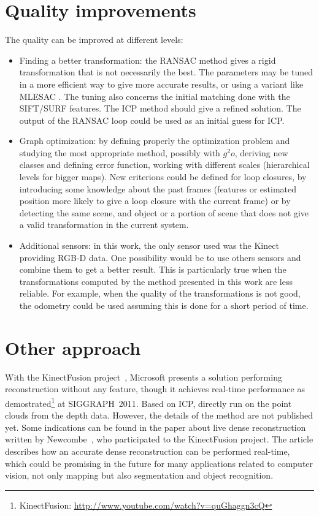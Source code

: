 \section{Quality improvements}

The quality can be improved at different levels:
\begin{itemize}
\item Finding a better transformation: the \gls{RANSAC} method gives a rigid transformation that is not necessarily the best. The parameters may be tuned in a more efficient way to give more accurate results, or using a variant like MLESAC \cite{TorrZ00}. The tuning also concerns the initial matching done with the \gls{SIFT}/\gls{SURF} features. The \gls{ICP} \cite{zhang_92_icp} method should give a refined solution. The output of the \gls{RANSAC} loop could be used as an initial guess for \gls{ICP}. 
\item Graph optimization: by defining properly the optimization problem and studying the most appropriate method, possibly with $g^2o$, deriving new classes and defining error function, working with different scales (hierarchical levels for bigger maps). New criterions could be defined for loop closures, by introducing some knowledge about the past frames (features or estimated position more likely to give a loop closure with the current frame) or by detecting the same scene, and object or a portion of scene that does not give a valid transformation in the current system.
\item Additional sensors: in this work, the only sensor used was the Kinect providing RGB-D data. One possibility would be to use others sensors and combine them to get a better result. This is particularly true when the transformations computed by the method presented in this work are less reliable. For example, when the quality of the transformations is not good, the odometry could be used assuming this is done for a short period of time.
\end{itemize}

\section{Other approach}

With the KinectFusion project~\cite{MSFusion}, Microsoft presents a solution performing reconstruction without any feature, though it achieves real-time performance as demostrated\footnote{KinectFusion: \url{http://www.youtube.com/watch?v=quGhaggn3cQ}} at SIGGRAPH~2011. Based on \gls{ICP}, directly run on the point clouds from the depth data. However, the details of the method are not published yet. Some indications can be found in the paper about live dense reconstruction written by Newcombe~\cite{Newcombe_2010}, who participated to the KinectFusion project. The article describes how an accurate dense reconstruction can be performed real-time, which could be promising in the future for many applications related to computer vision, not only mapping but also segmentation and object recognition.
